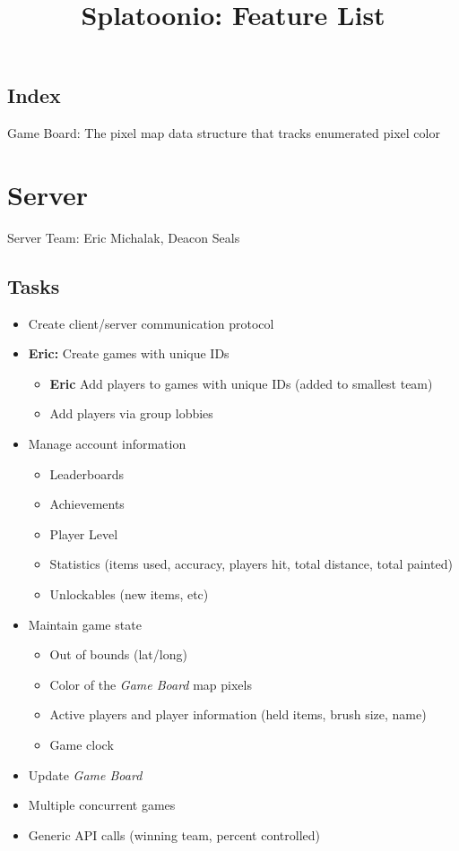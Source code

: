 \documentclass{article}
\title{Splatoonio: Feature List}
\author{}
\date{\vspace{-5ex}} %
\begin{document}
\maketitle
\tableofcontents

\subsection*{Index}
Game Board: The pixel map data structure that tracks enumerated pixel color

\newpage
\section{Server}
Server Team: Eric Michalak, Deacon Seals
\subsection{Tasks}
\begin{itemize}
\item Create client/server communication protocol
\item \textbf{Eric:} Create games with unique IDs
\begin{itemize}
	\item \textbf{Eric} Add players to games with unique IDs (added to smallest team)
	\item Add players via group lobbies
\end{itemize}
\item Manage account information
	\begin{itemize}
	\item Leaderboards
    \item Achievements
    \item Player Level
    \item Statistics (items used, accuracy, players hit, total distance, total painted)
    \item Unlockables (new items, etc)
	\end{itemize}
\item Maintain game state
	\begin{itemize}
	\item Out of bounds (lat/long)
    \item Color of the \emph{Game Board} map pixels
    \item Active players and player information (held items, brush size, name)
    \item Game clock
	\end{itemize}
\item Update \emph{Game Board}
\item Multiple concurrent games
\item Generic API calls (winning team, percent controlled)
\end{itemize}
\end{document}
